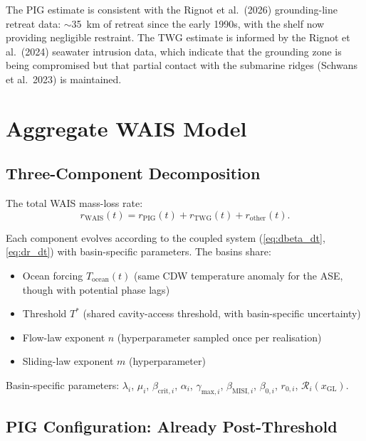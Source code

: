 \documentclass[11pt]{article}
\theoremstyle{definition}
\begin{document}
The PIG estimate is consistent with the Rignot et al.\ (2026) grounding-line retreat data: $\sim$35~km of retreat since the early 1990s, with the shelf now providing negligible restraint.  The TWG estimate is informed by the Rignot et al.\ (2024) seawater intrusion data, which indicate that the grounding zone is being compromised but that partial contact with the submarine ridges (Schwans et al.\ 2023) is maintained.


\section{Aggregate WAIS Model}
\label{sec:aggregate}

\subsection{Three-Component Decomposition}

The total WAIS mass-loss rate:
\begin{equation}
  r_\text{WAIS}(t) = r_\text{PIG}(t) + r_\text{TWG}(t) + r_{\text{other}}(t).
  \label{eq:decomposition}
\end{equation}

Each component evolves according to the coupled system (\cref{eq:dbeta_dt}, \cref{eq:dr_dt}) with basin-specific parameters.  The basins share:
\begin{itemize}
  \item Ocean forcing $T_{\text{ocean}}(t)$ (same CDW temperature anomaly for the ASE, though with potential phase lags)
  \item Threshold $T^{*}$ (shared cavity-access threshold, with basin-specific uncertainty)
  \item Flow-law exponent $n$ (hyperparameter sampled once per realisation)
  \item Sliding-law exponent $m$ (hyperparameter)
\end{itemize}

Basin-specific parameters: $\lambda_i$, $\mu_i$, $\beta_{\text{crit},i}$, $\alpha_i$, $\gamma_{\text{max},i}$, $\beta_{\text{MISI},i}$, $\beta_{0,i}$, $r_{0,i}$, $\mathcal{R}_i(x_\text{GL})$.

\subsection{PIG Configuration: Already Post-Threshold}
\end{document}
